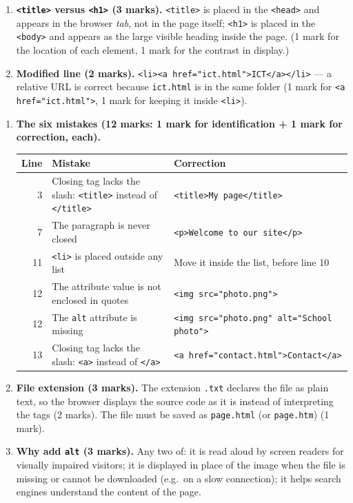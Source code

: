 \documentclass[11pt]{article}
\begin{document}
\begin{corrige}
\begin{enumerate}
\item \textbf{\texttt{<title>} versus \texttt{<h1>} (3 marks).} \texttt{<title>} is placed in the \texttt{<head>} and appears in the browser \emph{tab}, not in the page itself; \texttt{<h1>} is placed in the \texttt{<body>} and appears as the large visible heading inside the page. (1 mark for the location of each element, 1 mark for the contrast in display.)
\item \textbf{Modified line (2 marks).}
\texttt{<li><a href="ict.html">ICT</a></li>} — a relative URL is correct because \texttt{ict.html} is in the same folder (1 mark for \texttt{<a href="ict.html">}, 1 mark for keeping it inside \texttt{<li>}).
\end{enumerate}
\end{corrige}

\begin{corrige}
\begin{enumerate}
\item \textbf{The six mistakes (12 marks: 1 mark for identification + 1 mark for correction, each).}
\begin{center}
\begin{tabularx}{\linewidth}{|r|X|X|}
\hline
\rowcolor{popblueL} \textbf{Line} & \textbf{Mistake} & \textbf{Correction} \\
\hline
3 & Closing tag lacks the slash: \texttt{<title>} instead of \texttt{</title>} & \texttt{<title>My page</title>} \\
\hline
7 & The paragraph is never closed & \texttt{<p>Welcome to our site</p>} \\
\hline
11 & \texttt{<li>} is placed outside any list & Move it inside the list, before line 10 \\
\hline
12 & The attribute value is not enclosed in quotes & \texttt{<img src="photo.png">} \\
\hline
12 & The \texttt{alt} attribute is missing & \texttt{<img src="photo.png" alt="School photo">} \\
\hline
13 & Closing tag lacks the slash: \texttt{<a>} instead of \texttt{</a>} & \texttt{<a href="contact.html">Contact</a>} \\
\hline
\end{tabularx}
\end{center}
\item \textbf{File extension (3 marks).} The extension \texttt{.txt} declares the file as plain text, so the browser displays the source code as it is instead of interpreting the tags (2 marks). The file must be saved as \texttt{page.html} (or \texttt{page.htm}) (1 mark).
\item \textbf{Why add \texttt{alt} (3 marks).} Any two of: it is read aloud by screen readers for visually impaired visitors; it is displayed in place of the image when the file is missing or cannot be downloaded (e.g.\ on a slow connection); it helps search engines understand the content of the page.
\end{enumerate}
\end{corrige}
\end{document}
